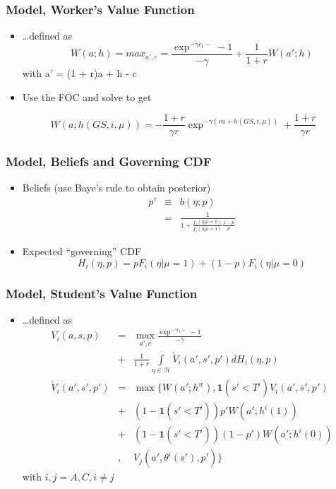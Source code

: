 \begin{frame}
	\frametitle{Model, Worker's Value Function}
		\begin{itemize}
			\item \ldots defined as
		\begin{equation}
			W(a;h) = max_{a',c} = \frac{\exp ^{- \gamma c_{t} -} - 1}{- \gamma} + \frac{1}{1 + r} W(a';h)
		\end{equation}
\noindent with a' = (1 + r)a + h - c
			\item Use the FOC and solve to get
		\end{itemize}
			\begin{equation}
				W(a; h(GS, i, \mu)) = - \frac{1+r}{\gamma r} \exp^ {- \gamma (ra +  h(GS, i, \mu) )} + \frac{1+r}{\gamma r}			
			\end{equation}
\end{frame}

\begin{frame}
	\frametitle{Model, Beliefs and Governing CDF}
		\begin{itemize}
			\item Beliefs (use Baye's rule to obtain posterior)
				\begin{eqnarray}
					p ' &\equiv& b(\eta; p) \nonumber \\
						&=& \frac{1}{1 + \frac{f_{i}(\eta|\mu=0)}{f_{i}(\eta|\mu=1)} \frac{1-p}{p}}
				\end{eqnarray}
			\item Expected ``governing'' CDF
				\begin{equation}
					H_{i}(\eta, p) = p F_{i} (\eta | \mu = 1) + (1 - p) F_{i} (\eta | \mu = 0) 
				\end{equation}
		\end{itemize}
\end{frame}

\begin{frame}
	\frametitle{Model, Student's Value Function}
		\begin{itemize}
			\item \ldots defined as
				\begin{eqnarray}
				V_{i}(a,s,p) &=& \max_{a',c} \frac{\exp ^{- \gamma c_{t} -} - 1}{- \gamma} \nonumber \\  
				             &+& \frac{1}{1+r} \int \limits _{\eta \in \mathcal{H}} \tilde{V}_{i} (a',s',p') dH_{i}(\eta,p) \\
				 \tilde{V}_{i} (a',s',p') &=& \max \{ W(a'; h^w), \mathbf{1}(s' < T^i) V_{i}(a',s',p') \nonumber \\ 
				  &+& (1 - \mathbf{1}(s' < T^i)) p'W(a';h^i(1)) \nonumber \\       &+& (1 - \mathbf{1}(s' < T^i)) (1-p')W(a';h^i(0))   \nonumber \\      &,& V_{j}(a', \theta^i(s'),p')\}        
				\end{eqnarray}
\noindent with $i,j = A,C, i \neq j$
		\end{itemize}
\end{frame}

